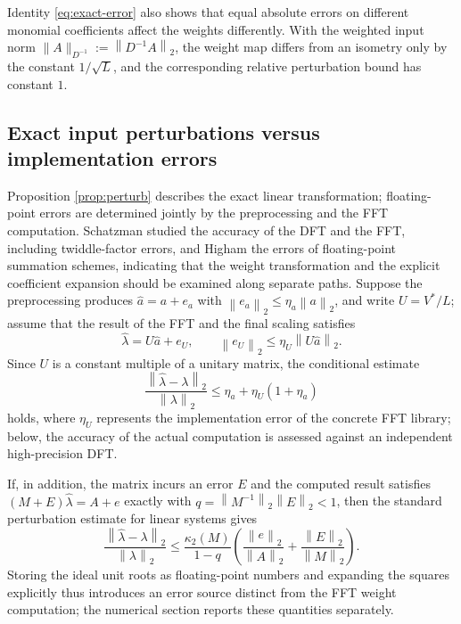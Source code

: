 \documentclass[10pt,twoside,final]{siamart1116}
\numberwithin{equation}{section}
\numberwithin{theorem}{section}
\newcommand{\norm}[1]{\left\lVert#1\right\rVert_2}
\newcommand{\cond}{\kappa_2}
\begin{document}
Identity \eqref{eq:exact-error} also shows that equal absolute errors on different
monomial coefficients affect the weights differently. With the weighted input norm
$\lVert A\rVert_{D^{-1}}:=\norm{D^{-1}A}$, the weight map differs from an isometry only
by the constant $1/\sqrt L$, and the corresponding relative perturbation bound has
constant $1$.

\subsection{Exact input perturbations versus implementation errors}

Proposition \ref{prop:perturb} describes the exact linear transformation; floating-point
errors are determined jointly by the preprocessing and the FFT computation. Schatzman
\cite{schatzman} studied the accuracy of the DFT and the FFT, including twiddle-factor
errors, and Higham \cite{summation} the errors of floating-point summation schemes,
indicating that the weight transformation and the explicit coefficient expansion should
be examined along separate paths. Suppose the preprocessing produces $\widehat a=a+e_a$
with $\norm{e_a}\le\eta_a\norm a$, and write $U=V^*/L$; assume that the result of the
FFT and the final scaling satisfies
\[
\widehat\lambda=U\widehat a+e_U,
\qquad \norm{e_U}\le\eta_U\norm{U\widehat a}.
\]
Since $U$ is a constant multiple of a unitary matrix, the conditional estimate
\begin{equation}\label{eq:model}
\frac{\norm{\widehat\lambda-\lambda}}{\norm\lambda}
\le\eta_a+\eta_U(1+\eta_a)
\end{equation}
holds, where $\eta_U$ represents the implementation error of the concrete FFT library;
below, the accuracy of the actual computation is assessed against an independent
high-precision DFT.

If, in addition, the matrix incurs an error $E$ and the computed result satisfies
$(M+E)\widehat\lambda=A+e$ exactly with $q=\norm{M^{-1}}\norm E<1$, then the standard
perturbation estimate for linear systems \cite[Chapter 7]{higham} gives
\begin{equation}\label{eq:matrix-perturbation}
\frac{\norm{\widehat\lambda-\lambda}}{\norm\lambda}
\le\frac{\cond(M)}{1-q}
\left(\frac{\norm e}{\norm A}+\frac{\norm E}{\norm M}\right).
\end{equation}
Storing the ideal unit roots as floating-point numbers and expanding the squares
explicitly thus introduces an error source distinct from the FFT weight computation; the
numerical section reports these quantities separately.
\end{document}
